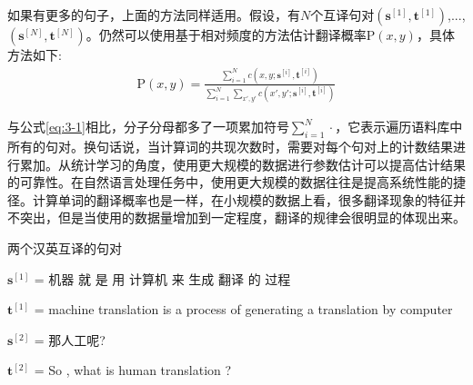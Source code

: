 \parinterval 如果有更多的句子，上面的方法同样适用。假设，有$N$个互译句对$(\mathbf{s}^{[1]},\mathbf{t}^{[1]})$,...,\\$(\mathbf{s}^{[N]},\mathbf{t}^{[N]})$。仍然可以使用基于相对频度的方法估计翻译概率$\textrm{P}(x,y)$，具体方法如下:
\begin{eqnarray}
\textrm{P}(x,y)  =  \frac{{\sum_{i=1}^{N} c(x,y;\mathbf{s}^{[i]},\mathbf{t}^{[i]})}}{\sum_{i=1}^{N}{{\sum_{x',y'} c(x',y';\mathbf{s}^{[i]},\mathbf{t}^{[i]})}}}
\label{eq:3-4}
\end{eqnarray}

\noindent 与公式\ref{eq:3-1}相比，分子分母都多了一项累加符号$\sum_{i=1}^{N} \cdot$，它表示遍历语料库中所有的句对。换句话说，当计算词的共现次数时，需要对每个句对上的计数结果进行累加。从统计学习的角度，使用更大规模的数据进行参数估计可以提高估计结果的可靠性。在自然语言处理任务中，使用更大规模的数据往往是提高系统性能的捷径。计算单词的翻译概率也是一样，在小规模的数据上看，很多翻译现象的特征并不突出，但是当使用的数据量增加到一定程度，翻译的规律会很明显的体现出来。

\begin{example}
两个汉英互译的句对

$\mathbf{s}^{[1]}$ = 机器\; 就\; 是\; 用\; 计算机\; 来\; 生成\; {\color{red}翻译}\; 的\; 过程

$\mathbf{t}^{[1]}$ = machine\; {\color{red}translation}\; is\; a\; process\; of\; generating\; a\;  {\color{red}translation}\; by\; computer

$\mathbf{s}^{[2]}$ = 那\quad 人工\quad 呢\quad ?

$\mathbf{t}^{[2]}$ = So\; ,\; what\; is\; human\; {\color{red}translation}\; ?
\label{eg:3-2}
\end{example}

